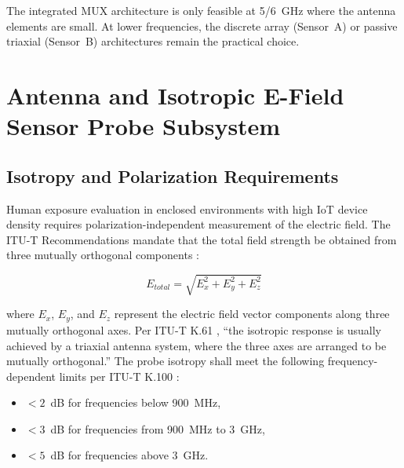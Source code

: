 \documentclass[11pt,a4paper]{article}
\begin{document}
\noindent The integrated MUX architecture is only feasible at 5/6~GHz where the antenna elements are small. At lower frequencies, the discrete array (Sensor~A) or passive triaxial (Sensor~B) architectures remain the practical choice.

\section{Antenna and Isotropic E-Field Sensor Probe Subsystem}
\label{sec:antenna_subsystem}

\subsection{Isotropy and Polarization Requirements}

Human exposure evaluation in enclosed environments with high IoT device density requires polarization-independent measurement of the electric field. The ITU-T Recommendations mandate that the total field strength be obtained from three mutually orthogonal components \cite{itut_k100, itut_k61, itut_k91, itut_k113}:

\begin{equation}
    E_{total} = \sqrt{E_x^2 + E_y^2 + E_z^2}
    \label{eq:isotropic_total}
\end{equation}

\noindent where $E_x$, $E_y$, and $E_z$ represent the electric field vector components along three mutually orthogonal axes. Per ITU-T K.61 \cite{itut_k61}, ``the isotropic response is usually achieved by a triaxial antenna system, where the three axes are arranged to be mutually orthogonal.'' The probe isotropy shall meet the following frequency-dependent limits per ITU-T K.100 \cite{itut_k100}:

\begin{itemize}
    \item $< 2$~dB for frequencies below 900~MHz,
    \item $< 3$~dB for frequencies from 900~MHz to 3~GHz,
    \item $< 5$~dB for frequencies above 3~GHz.
\end{itemize}
\end{document}
